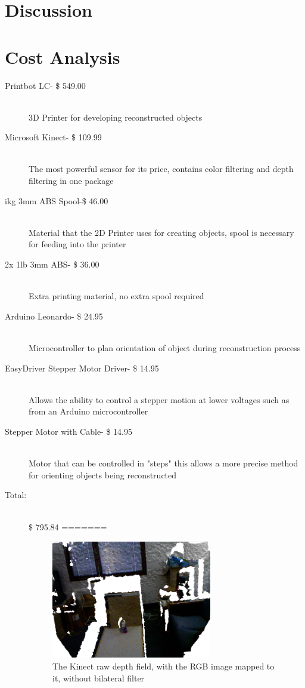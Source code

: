 \documentclass[12pt,twocolumn]{article}
\begin{document}
\section{Discussion}


\section{Cost Analysis}

  \begin{description}

  \item[Printbot LC- \$ 549.00] \hfill \\
  3D Printer for developing reconstructed objects
  \item[Microsoft Kinect- \$ 109.99] \hfill \\
  The most powerful sensor for its price, contains color filtering and depth filtering in one package
  \item[ikg 3mm ABS Spool-\$ 46.00] \hfill \\
  Material that the 2D Printer uses for creating objects, spool is necessary for feeding into the printer
  \item[2x 1lb 3mm ABS- \$ 36.00] \hfill \\
  Extra printing material, no extra spool required
  \item[Arduino Leonardo-  \$ 24.95] \hfill \\
  Microcontroller to plan orientation of object during reconstruction process
  \item[EasyDriver Stepper Motor Driver- \$ 14.95] \hfill \\
  Allows the ability to control a stepper motion at lower voltages such as from an Arduino microcontroller
  \item[Stepper Motor with Cable- \$ 14.95] \hfill \\
  Motor that can be controlled in "steps" this allows a more precise method for orienting objects being reconstructed
  \item[Total:] \hfill \\
  \$ 795.84
=======
\begin{figure}[H]
\centering
\includegraphics[width=70mm]{kinectwaterbottle.png}
\caption{The Kinect raw depth field, with the RGB image mapped to it, without bilateral filter}
\label{waterbot}
\end{figure}


\end{description}
\end{document}
